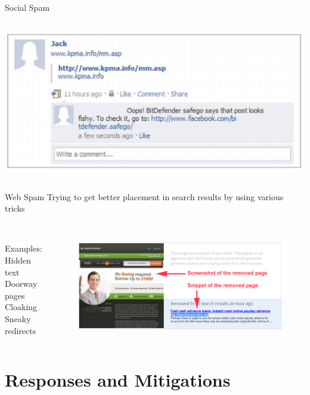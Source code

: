 \documentclass[nobackground,dvipsnames,table,aspectratio=169]{beamer}
\begin{document}
\begin{frame}{Social Spam}
\begin{columns}
            \includegraphics[width=\textwidth]{facebook-spam}
    \end{columns}
\end{frame}

\begin{frame}{Web Spam}
    Trying to get better placement in search results by using various tricks\\~\\
    \begin{columns}
            Examples:\\
            Hidden text\\ 
            Doorway pages\\ 
            Cloaking\\
            Sneaky redirects
            \begin{figure}
                \includegraphics[width=\textwidth, right]{fastcash}
            \end{figure}
    \end{columns}
\end{frame}

\section{Responses and Mitigations}
\end{document}
